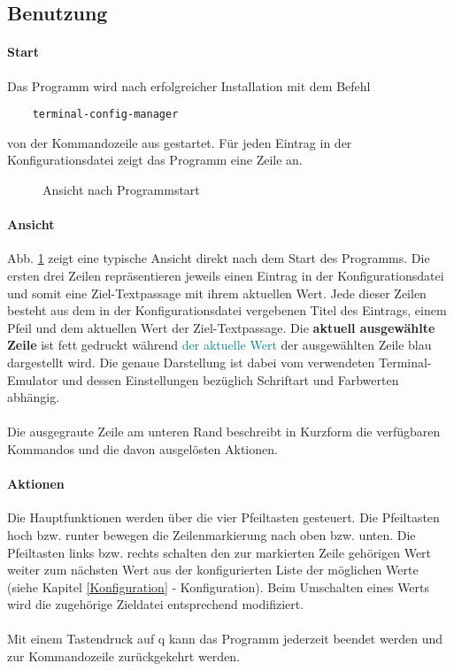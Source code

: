 \subsection{Benutzung} \label{Benutzung}
\paragraph{Start}
Das Programm wird nach erfolgreicher Installation mit dem Befehl

\begin{verbatim}
    terminal-config-manager
\end{verbatim}

von der Kommandozeile aus gestartet. Für jeden Eintrag in der Konfigurationsdatei
zeigt das Programm eine Zeile an.

\begin{figure}
    \caption{Ansicht nach Programmstart}
    \label{post-start}
    \begin{center}
    \end{center}
\end{figure}

\paragraph{Ansicht}
Abb. \ref{post-start} zeigt eine typische Ansicht direkt nach dem Start des
Programms. Die ersten drei Zeilen repräsentieren jeweils einen Eintrag in
der Konfigurationsdatei und somit eine Ziel-\gls{Textpassage} mit ihrem
aktuellen Wert. Jede dieser Zeilen besteht aus dem in der Konfigurationsdatei
vergebenen Titel des Eintrags, einem Pfeil und dem aktuellen Wert der Ziel-\gls{Textpassage}.
Die \textbf{aktuell ausgewählte Zeile} ist fett gedruckt während
\textcolor{teal}{der aktuelle Wert} der ausgewählten Zeile blau dargestellt wird.
Die genaue Darstellung ist dabei vom verwendeten Terminal-Emulator und dessen
Einstellungen bezüglich Schriftart und Farbwerten abhängig.

\paragraph{}
Die ausgegraute Zeile am unteren Rand beschreibt in Kurzform die verfügbaren
Kommandos und die davon ausgelösten Aktionen.

\paragraph{Aktionen}
Die Hauptfunktionen werden über die vier Pfeiltasten gesteuert. Die Pfeiltasten
hoch bzw. runter bewegen die Zeilenmarkierung nach oben bzw. unten. Die Pfeiltasten
links bzw. rechts schalten den zur markierten Zeile gehörigen Wert weiter zum
nächsten Wert aus der konfigurierten Liste der möglichen Werte
(siehe Kapitel \ref{Konfiguration} - Konfiguration). Beim Umschalten eines Werts
wird die zugehörige Zieldatei entsprechend modifiziert.

\paragraph{} Mit einem Tastendruck auf q kann das Programm jederzeit beendet werden
und zur Kommandozeile zurückgekehrt werden.